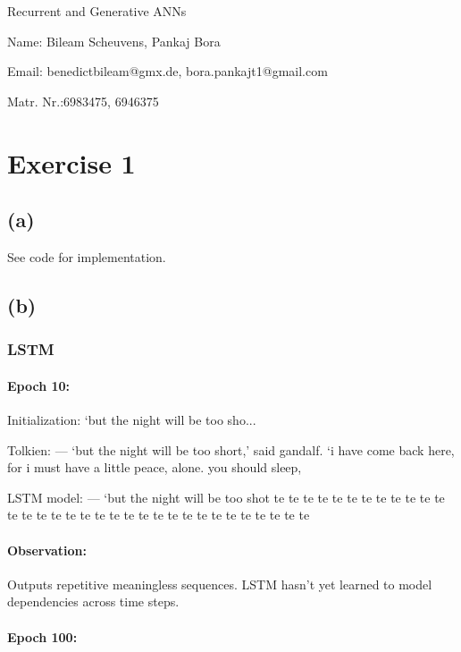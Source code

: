 \documentclass[11pt]{article}
\numberwithin{equation}{section}
\begin{document}
\begin{center}
    \sc Recurrent and Generative ANNs
\end{center}

\noindent Name: Bileam Scheuvens, Pankaj Bora

\noindent Email: benedictbileam@gmx.de, bora.pankajt1@gmail.com

\noindent Matr. Nr.:6983475, 6946375



\section{Exercise 1}
\subsection{(a)}
See code for implementation.
\newline
\subsection{(b)}

\subsubsection{LSTM}

\paragraph{Epoch 10:}

Initialization: ‘but the night will be too sho...

Tolkien: --- ‘but the night will be too short,’ said gandalf. ‘i have come back
here, for i must have a little peace, alone. you should sleep,

LSTM model: --- ‘but the night will be too shot te te te te te te te te te te te
te te te te te te te te te te te te te te te te te te te te te te

\paragraph{Observation:} Outputs repetitive meaningless sequences. LSTM hasn't yet learned to
model dependencies across time steps.

\paragraph{Epoch 100:}
\end{document}
